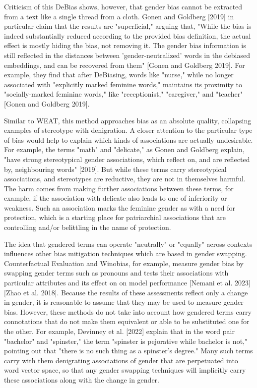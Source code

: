 \documentclass[11pt]{article}
\begin{document}
Criticism of this DeBias shows, however, that gender bias cannot be
extracted from a text like a single thread from a cloth. Gonen and
Goldberg [2019] in particular claim that the results are
"superficial," arguing that, "While the bias is indeed substantially
reduced according to the provided bias definition, the actual effect
is mostly hiding the bias, not removing it. The gender bias
information is still reflected in the distances between
'gender-neutralized' words in the debiased embeddings, and can be
recovered from them" [Gonen and Goldberg 2019]. For example, they find
that after DeBiasing, words like "nurse," while no longer associated
with "explicitly marked feminine words," maintains its proximity to
"socially-marked feminine words," like "receptionist," "caregiver,"
and "teacher" [Gonen and Goldberg 2019].

Similar to WEAT, this method approaches bias as an absolute quality,
collapsing examples of stereotype with denigration. A closer attention
to the particular type of bias would help to explain which kinds of
associations are actually undesirable. For example, the terms "math"
and "delicate," as Gonen and Goldberg explain, "have strong
stereotypical gender associations, which reflect on, and are reflected
by, neighbouring words" [2019]. But while these terms carry
stereotypical associations, and stereotypes are reductive, they are
not in themselves harmful. The harm comes from making further
associations between these terms, for example, if the association with
delicate also leads to one of inferiority or weakness. Such an
association marks the feminine gender as with a need for protection,
which is a starting place for patriarchial associations that are
controlling and/or belittling in the name of protection. 

The idea that gendered terms can operate "neutrally" or "equally"
across contexts influences other bias mitigation techniques which are
based in gender swapping. Counterfactual Evaluation and Winobias, for
example, measure gender bias by swapping gender terms such as pronouns
and tests their associations with particular attributes and its effect
on on model performance [Nemani et al. 2023] [Zhao et al. 2018].
Because the results of these assessments reflect only a change in
gender, it is reasonable to assume that they may be used to measure
gender bias. However, these methods do not take into account how
gendered terms carry connotations that do not make them equivalent or
able to be substituted one for the other. For example, Devinney et al.
[2022] explain that in the word pair "bachelor" and "spinster," the
term "spinster is pejorative while bachelor is not," pointing out that
"there is no such thing as a spinster’s degree." Many such terms carry
with them denigrating associations of gender that are perpetuated into
word vector space, so that any gender swapping techniques will
implicitly carry these associations along with the change in gender.
\end{document}

